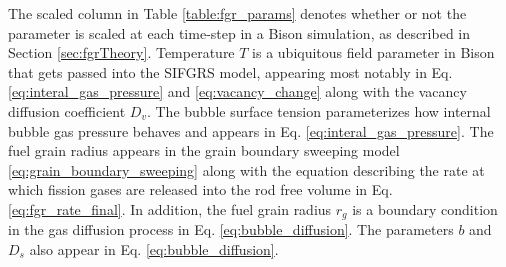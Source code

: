 The scaled column in Table \ref{table:fgr_params} denotes whether or not the parameter is scaled at each time-step in a Bison simulation, as described in Section \ref{sec:fgrTheory}. Temperature $T$ is a ubiquitous field parameter in Bison that gets passed into the \ac{SIFGRS} model, appearing most notably in Eq. \ref{eq:interal_gas_pressure} and \ref{eq:vacancy_change} along with the vacancy diffusion coefficient $D_v$. The bubble surface tension parameterizes how internal bubble gas pressure behaves and appears in Eq. \ref{eq:interal_gas_pressure}. The fuel grain radius appears in the grain boundary sweeping model \ref{eq:grain_boundary_sweeping} along with the equation describing the rate at which fission gases are released into the rod free volume in Eq. \ref{eq:fgr_rate_final}. In addition, the fuel grain radius $r_g$ is a boundary condition in the gas diffusion process in Eq. \ref{eq:bubble_diffusion}. The parameters $b$ and $D_s$ also appear in Eq. \ref{eq:bubble_diffusion}.   

